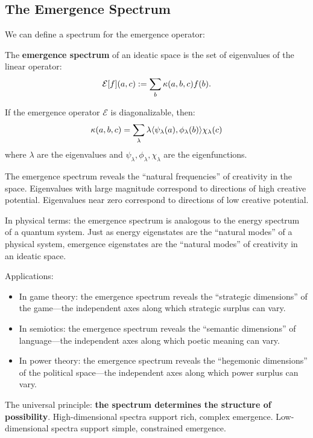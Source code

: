 \subsection{The Emergence Spectrum}

We can define a spectrum for the emergence operator:

\begin{definition}
\label{def:emergence-spectrum}
The \textbf{emergence spectrum} of an ideatic space is the set of eigenvalues
of the linear operator:
\[
  \mathcal{E}[f](a, c) := \sum_b \kappa(a, b, c) f(b).
\]
\end{definition}

\begin{theorem}
\label{thm:spectral-decomposition}
If the emergence operator $\mathcal{E}$ is diagonalizable, then:
\[
  \kappa(a, b, c) = \sum_\lambda \lambda \langle \psi_\lambda(a), \phi_\lambda(b) \rangle \chi_\lambda(c)
\]
where $\lambda$ are the eigenvalues and $\psi_\lambda, \phi_\lambda, \chi_\lambda$
are the eigenfunctions.
\end{theorem}

\begin{interpretation}
The emergence spectrum reveals the ``natural frequencies'' of creativity in
the space. Eigenvalues with large magnitude correspond to directions of high
creative potential. Eigenvalues near zero correspond to directions of low
creative potential.

In physical terms: the emergence spectrum is analogous to the energy spectrum
of a quantum system. Just as energy eigenstates are the ``natural modes'' of
a physical system, emergence eigenstates are the ``natural modes'' of creativity
in an ideatic space.

Applications:
\begin{itemize}
  \item In game theory: the emergence spectrum reveals the ``strategic dimensions''
    of the game---the independent axes along which strategic surplus can vary.
  \item In semiotics: the emergence spectrum reveals the ``semantic dimensions''
    of language---the independent axes along which poetic meaning can vary.
  \item In power theory: the emergence spectrum reveals the ``hegemonic dimensions''
    of the political space---the independent axes along which power surplus can vary.
\end{itemize}

The universal principle: \textbf{the spectrum determines the structure of
possibility}. High-dimensional spectra support rich, complex emergence. Low-dimensional
spectra support simple, constrained emergence.
\end{interpretation}


